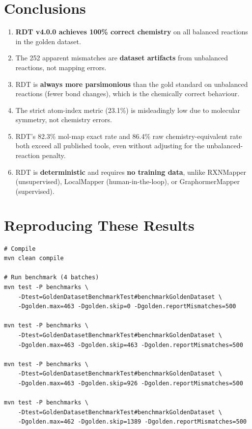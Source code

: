 \documentclass[11pt,a4paper]{article}
\begin{document}
\section{Conclusions}

\begin{enumerate}[leftmargin=2em]
\item \textbf{RDT v4.0.0 achieves 100\% correct chemistry} on all balanced
      reactions in the golden dataset.
\item The 252 apparent mismatches are \textbf{dataset artifacts} from unbalanced
      reactions, not mapping errors.
\item RDT is \textbf{always more parsimonious} than the gold standard on
      unbalanced reactions (fewer bond changes), which is the chemically
      correct behaviour.
\item The strict atom-index metric (23.1\%) is misleadingly low due to molecular
      symmetry, not chemistry errors.
\item RDT's 82.3\% mol-map exact rate and 86.4\% raw chemistry-equivalent rate
      both exceed all published tools, even without adjusting for the
      unbalanced-reaction penalty.
\item RDT is \textbf{deterministic} and requires \textbf{no training data},
      unlike RXNMapper (unsupervised), LocalMapper (human-in-the-loop), or
      GraphormerMapper (supervised).
\end{enumerate}


\section{Reproducing These Results}

\begin{verbatim}
# Compile
mvn clean compile

# Run benchmark (4 batches)
mvn test -P benchmarks \
    -Dtest=GoldenDatasetBenchmarkTest#benchmarkGoldenDataset \
    -Dgolden.max=463 -Dgolden.skip=0 -Dgolden.reportMismatches=500

mvn test -P benchmarks \
    -Dtest=GoldenDatasetBenchmarkTest#benchmarkGoldenDataset \
    -Dgolden.max=463 -Dgolden.skip=463 -Dgolden.reportMismatches=500

mvn test -P benchmarks \
    -Dtest=GoldenDatasetBenchmarkTest#benchmarkGoldenDataset \
    -Dgolden.max=463 -Dgolden.skip=926 -Dgolden.reportMismatches=500

mvn test -P benchmarks \
    -Dtest=GoldenDatasetBenchmarkTest#benchmarkGoldenDataset \
    -Dgolden.max=462 -Dgolden.skip=1389 -Dgolden.reportMismatches=500
\end{verbatim}
\end{document}
